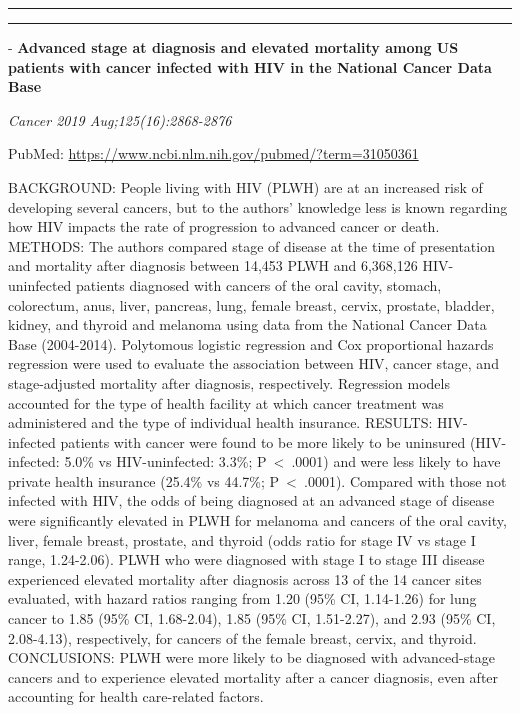 \documentclass[]{article}
\begin{document}
{}

{}

\begin{center}\rule{0.5\linewidth}{\linethickness}\end{center}

\begin{center}\rule{0.5\linewidth}{\linethickness}\end{center}

 - \textbf{Advanced stage at diagnosis and elevated mortality among US
patients with cancer infected with HIV in the National Cancer Data Base}

\emph{Cancer 2019 Aug;125(16):2868-2876}

PubMed: \url{https://www.ncbi.nlm.nih.gov/pubmed/?term=31050361}

BACKGROUND: People living with HIV (PLWH) are at an increased risk of
developing several cancers, but to the authors' knowledge less is known
regarding how HIV impacts the rate of progression to advanced cancer or
death. METHODS: The authors compared stage of disease at the time of
presentation and mortality after diagnosis between 14,453 PLWH and
6,368,126 HIV-uninfected patients diagnosed with cancers of the oral
cavity, stomach, colorectum, anus, liver, pancreas, lung, female breast,
cervix, prostate, bladder, kidney, and thyroid and melanoma using data
from the National Cancer Data Base (2004-2014). Polytomous logistic
regression and Cox proportional hazards regression were used to evaluate
the association between HIV, cancer stage, and stage-adjusted mortality
after diagnosis, respectively. Regression models accounted for the type
of health facility at which cancer treatment was administered and the
type of individual health insurance. RESULTS: HIV-infected patients with
cancer were found to be more likely to be uninsured (HIV-infected: 5.0\%
vs HIV-uninfected: 3.3\%; P~\textless{}~.0001) and were less likely to
have private health insurance (25.4\% vs 44.7\%; P~\textless{}~.0001).
Compared with those not infected with HIV, the odds of being diagnosed
at an advanced stage of disease were significantly elevated in PLWH for
melanoma and cancers of the oral cavity, liver, female breast, prostate,
and thyroid (odds ratio for stage IV vs stage I range, 1.24-2.06). PLWH
who were diagnosed with stage I to stage III disease experienced
elevated mortality after diagnosis across 13 of the 14 cancer sites
evaluated, with hazard ratios ranging from 1.20 (95\% CI, 1.14-1.26) for
lung cancer to 1.85 (95\% CI, 1.68-2.04), 1.85 (95\% CI, 1.51-2.27), and
2.93 (95\% CI, 2.08-4.13), respectively, for cancers of the female
breast, cervix, and thyroid. CONCLUSIONS: PLWH were more likely to be
diagnosed with advanced-stage cancers and to experience elevated
mortality after a cancer diagnosis, even after accounting for health
care-related factors.
\end{document}
